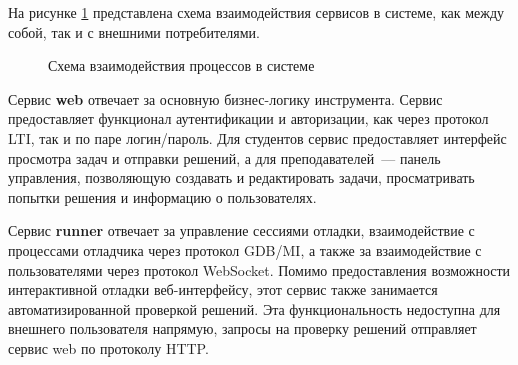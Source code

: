 \documentclass[a4paper,article,14pt]{extarticle}
\begin{document}
На рисунке \ref{fig:processes_arch} представлена схема взаимодействия сервисов в системе, как между собой, так и с внешними потребителями.

\begin{figure}[h]
    \begin{center}
        \caption{\label{fig:processes_arch} Схема взаимодействия процессов в системе}
    \end{center}
\end{figure}

Сервис \textbf{web} отвечает за основную бизнес-логику инструмента. Сервис предоставляет функционал аутентификации и авторизации, как через протокол LTI, так и по паре логин/пароль. Для студентов сервис предоставляет интерфейс просмотра задач и отправки решений, а для преподавателей~--- панель управления, позволяющую создавать и редактировать задачи, просматривать попытки решения и информацию о пользователях.

Сервис \textbf{runner} отвечает за управление сессиями отладки, взаимодействие с процессами отладчика через протокол GDB/MI, а также за взаимодействие с пользователями через протокол WebSocket. Помимо предоставления возможности интерактивной отладки веб-интерфейсу, этот сервис также занимается автоматизированной проверкой решений. Эта функциональность недоступна для внешнего пользователя напрямую, запросы на проверку решений отправляет сервис web по протоколу HTTP.
\end{document}
